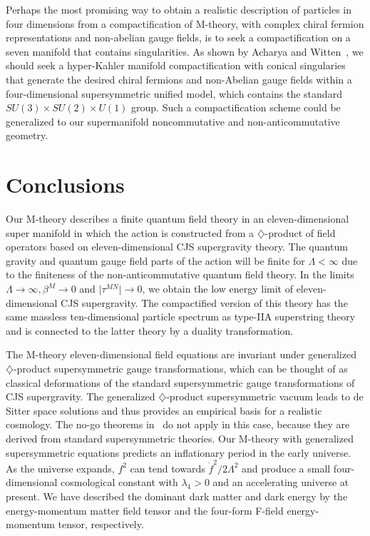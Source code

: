 \documentclass[a4paper,12pt]{article}
\begin{document}
Perhaps the most promising way to obtain a realistic description of particles in
four dimensions from a compactification of M-theory, with complex chiral
fermion representations and non-abelian gauge fields, is to seek
a compactification on a seven manifold that contains singularities. As shown by
Acharya and Witten~\cite{Acharya}, we should seek a hyper-Kahler manifold
compactification with conical singularies that generate the desired chiral fermions
and non-Abelian gauge fields within a four-dimensional supersymmetric unified model,
which contains the standard $SU(3)\times SU(2)\times U(1)$ group.  Such
a compactification scheme could be generalized to our supermanifold noncommutative
and non-anticommutative geometry.

\section{Conclusions}

Our M-theory describes a finite quantum field theory in an
eleven-dimensional super manifold in which the action is constructed from a
$\diamondsuit$-product of field operators based on eleven-dimensional CJS
supergravity theory. The quantum gravity and quantum gauge field parts of
the action will be finite for $\Lambda < \infty$ due to the finiteness of
the non-anticommutative quantum field theory. In the limits
$\Lambda\rightarrow\infty, \beta^M\rightarrow 0$ and $\vert\tau^{MN}\vert\rightarrow
0$, we obtain the low energy limit of eleven-dimensional CJS supergravity. The
compactified version of this theory has the same massless ten-dimensional particle
spectrum as type-IIA superstring theory and is connected to the latter theory by a
duality transformation.

The M-theory eleven-dimensional field equations are invariant under
generalized $\diamondsuit$-product supersymmetric gauge transformations,
which can be thought of as classical deformations of the standard
supersymmetric gauge transformations of CJS supergravity. The generalized
$\diamondsuit$-product supersymmetric vacuum leads to de Sitter
space solutions and thus provides an empirical basis for a
realistic cosmology. The no-go theorems
in~\cite{Gibbons,Maldacena} do not apply in this case, because
they are derived from standard supersymmetric theories. Our
M-theory with generalized supersymmetric equations predicts an
inflationary period in the early universe. As the universe
expands, $f^2$ can tend towards ${\dot f}^2/2\Lambda^2$ and
produce a small four-dimensional cosmological constant with
$\lambda_4 > 0$ and an accelerating universe at present. We have
described the dominant dark matter and dark energy by the
energy-momentum matter field tensor and the
four-form F-field energy-momentum tensor, respectively.
\end{document}
